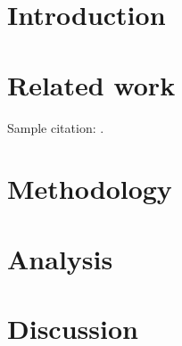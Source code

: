 
\chapter{Introduction}



\chapter{Related work}

Sample citation: \cite{bush1945we}.



\chapter{Methodology}


\chapter{Analysis}


\chapter{Discussion}




